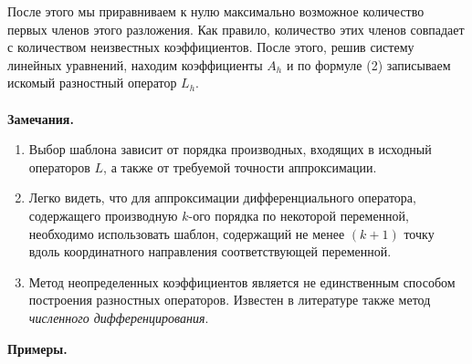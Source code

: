 \documentclass[a4paper, 12pt]{report}
\numberwithin{equation}{section}
\begin{document}
	После этого мы приравниваем к нулю максимально возможное количество первых членов этого разложения. Как правило, количество этих членов совпадает с количеством неизвестных коэффициентов. После этого, решив систему линейных уравнений, находим коэффициенты $A_h$ и по формуле (2) записываем искомый разностный оператор $L_h$.
	\\\\
	\textbf{Замечания.}
	\begin{enumerate}
		\item Выбор шаблона зависит от порядка производных, входящих в исходный операторов $L$, а также от требуемой точности аппроксимации.
		\item Легко видеть, что для аппроксимации дифференциального оператора, содержащего производную $k$-ого порядка по некоторой переменной, необходимо использовать шаблон, содержащий не менее $(k+1)$ точку вдоль координатного направления соответствующей переменной.
		\item Метод неопределенных коэффициентов является не единственным способом построения разностных операторов. Известен в литературе также метод \textit{численного дифференцирования}.
	\end{enumerate}
	\textbf{Примеры.}
\end{document}
